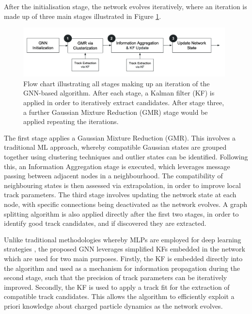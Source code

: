 After the initialisation stage, the network evolves iteratively, where an iteration is made up of three main stages illustrated in Figure \ref{fig:flowchart}. 

\begin{figure}[htbp]
    \centering
    \includegraphics[width=0.98\textwidth]{images/5-gnn-algorithm/gnn-workflow.png}
    \caption{Flow chart illustrating all stages making up an iteration of the GNN-based algorithm. After each stage, a Kalman filter (KF) is applied in order to iteratively extract candidates. After stage three, a further Gaussian Mixture Reduction (GMR) stage would be applied repeating the iterations.}
    \label{fig:flowchart}%
\end{figure}


The first stage applies a Gaussian Mixture Reduction (GMR). This involves a traditional ML approach, whereby compatible Gaussian states are grouped together using clustering techniques and outlier states can be identified. Following this, an Information Aggregation stage is executed, which leverages message passing between adjacent nodes in a neighbourhood. The compatibility of neighbouring states is then assessed via extrapolation, in order to improve local track parameters. The third stage involves updating the network state at each node, with specific connections being deactivated as the network evolves. A graph splitting algorithm is also applied directly after the first two stages, in order to identify good track candidates, and if discovered they are extracted. 

Unlike traditional methodologies whereby MLPs are employed for deep learning strategies \cite{Caillou:28155782}, the proposed GNN leverages simplified KFs embedded in the network which are used for two main purposes. Firstly, the KF is embedded directly into the algorithm and used as a mechanism for information propagation during the second stage, such that the precision of track parameters can be iteratively improved. Secondly, the KF is used to apply a track fit for the extraction of compatible track candidates. This allows the algorithm to efficiently exploit a priori knowledge about charged particle dynamics as the network evolves.

